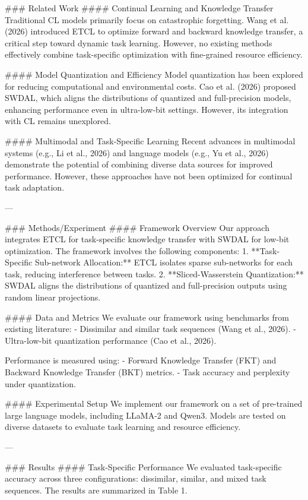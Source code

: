 ### Related Work
#### Continual Learning and Knowledge Transfer
Traditional CL models primarily focus on catastrophic forgetting. Wang et al. (2026) introduced ETCL to optimize forward and backward knowledge transfer, a critical step toward dynamic task learning. However, no existing methods effectively combine task-specific optimization with fine-grained resource efficiency.

#### Model Quantization and Efficiency
Model quantization has been explored for reducing computational and environmental costs. Cao et al. (2026) proposed SWDAL, which aligns the distributions of quantized and full-precision models, enhancing performance even in ultra-low-bit settings. However, its integration with CL remains unexplored.

#### Multimodal and Task-Specific Learning
Recent advances in multimodal systems (e.g., Li et al., 2026) and language models (e.g., Yu et al., 2026) demonstrate the potential of combining diverse data sources for improved performance. However, these approaches have not been optimized for continual task adaptation.

---

### Methods/Experiment
#### Framework Overview
Our approach integrates ETCL for task-specific knowledge transfer with SWDAL for low-bit optimization. The framework involves the following components:
1. **Task-Specific Sub-network Allocation:** ETCL isolates sparse sub-networks for each task, reducing interference between tasks.
2. **Sliced-Wasserstein Quantization:** SWDAL aligns the distributions of quantized and full-precision outputs using random linear projections.

#### Data and Metrics
We evaluate our framework using benchmarks from existing literature:
- Dissimilar and similar task sequences (Wang et al., 2026).
- Ultra-low-bit quantization performance (Cao et al., 2026).

Performance is measured using:
- Forward Knowledge Transfer (FKT) and Backward Knowledge Transfer (BKT) metrics.
- Task accuracy and perplexity under quantization.

#### Experimental Setup
We implement our framework on a set of pre-trained large language models, including LLaMA-2 and Qwen3. Models are tested on diverse datasets to evaluate task learning and resource efficiency.

---

### Results
#### Task-Specific Performance
We evaluated task-specific accuracy across three configurations: dissimilar, similar, and mixed task sequences. The results are summarized in Table 1.

